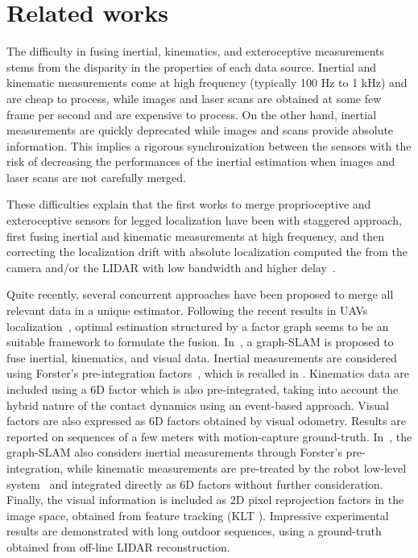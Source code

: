 \section{Related works}

The difficulty in fusing inertial, kinematics, and exteroceptive measurements stems from the disparity in the properties of each data source.
Inertial and kinematic measurements come at high frequency (typically 100 Hz to 1 kHz) and are cheap to process, while images and laser scans 
are obtained at some few frame per second and are expensive to process. 
On the other hand, inertial measurements are quickly deprecated while images and scans provide absolute information.
This implies a rigorous synchronization between the sensors with the risk of decreasing the performances of the inertial 
estimation when images and laser scans are not carefully merged. 

These difficulties explain that the first works to merge proprioceptive and exteroceptive sensors for legged localization 
have been with staggered approach, first fusing inertial and kinematic measurements at high frequency, and then correcting 
the localization drift with absolute localization computed the from the camera and/or the LIDAR with low bandwidth and higher 
delay~\cite{nobili2017heterogeneous,fallon2014drift}.

Quite recently, several concurrent approaches have been proposed to merge all relevant data in a unique estimator.
Following the recent results in UAVs localization~\cite{forster2017-TRO,leutenegger2015keyframe}, optimal estimation 
structured by a factor graph seems to be an suitable framework to formulate the fusion.
In~\cite{hartley2018legged}, a graph-SLAM is proposed to fuse inertial, kinematics, and visual data.
Inertial measurements are considered using Forster's pre-integration factors~\cite{forster2017-TRO}, which is recalled in .
Kinematics data are included using a 6D factor which is also pre-integrated, taking into account the hybrid nature 
of the contact dynamics using an event-based approach.
Visual factors are also expressed as 6D factors obtained by visual odometry. Results are reported on sequences of a few meters with motion-capture ground-truth.
In~\cite{wisth2019robust}, the graph-SLAM also considers inertial measurements through Forster's pre-integration, while kinematic
 measurements are pre-treated by the robot low-level system~\cite{bloesch2017two} and integrated directly as 6D factors without further consideration.
Finally, the visual information is included as 2D pixel reprojection factors in the image space, obtained from feature tracking (KLT \cite{baker2004lucas}).
Impressive experimental results are demonstrated with long outdoor sequences, using a ground-truth obtained from off-line LIDAR reconstruction.

